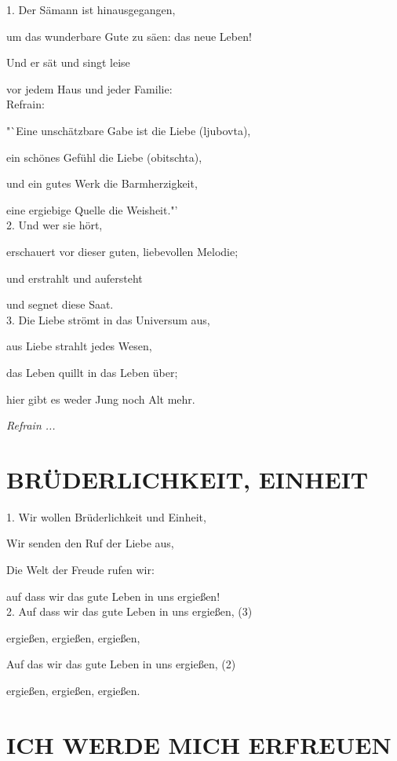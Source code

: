 \documentclass[11pt,a5paper,twoside]{article}
\begin{document}
1. Der Sämann ist hinausgegangen, 

um das wunderbare Gute zu säen: das neue Leben!

Und er sät und singt leise 

vor jedem Haus und jeder Familie:\\

Refrain: 

"`Eine unschätzbare Gabe ist die Liebe (ljubovta), 

ein schönes Gefühl die Liebe (obitschta), 

und ein gutes Werk die Barmherzigkeit, 

eine ergiebige Quelle die Weisheit."'\\

2. Und wer sie hört, 

erschauert vor dieser guten, liebevollen Melodie; 

und erstrahlt und aufersteht

und segnet diese Saat.\\

3. Die Liebe strömt in das Universum aus, 

aus Liebe strahlt jedes Wesen, 

das Leben quillt in das Leben über; 

hier gibt es weder Jung noch Alt mehr.

\textit{Refrain ...}

\section[Brüderlichkeit, Einheit]{BRÜDERLICHKEIT, EINHEIT}

1. Wir wollen Brüderlichkeit und Einheit,

Wir senden den Ruf der Liebe aus,

Die Welt der Freude rufen wir:

auf dass wir das gute Leben in uns
ergießen!\\

2. Auf dass wir das gute Leben in uns ergießen, (3)

ergießen, ergießen, ergießen,

Auf das wir das gute Leben in uns ergießen, (2)

ergießen, ergießen, ergießen.

\section[Ich werde mich erfreuen]{ICH WERDE MICH ERFREUEN}
\end{document}
